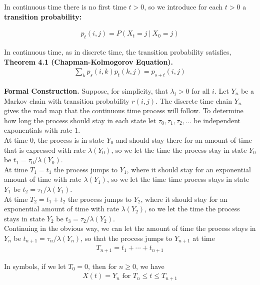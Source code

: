 \documentclass[12pt]{article}
\begin{document}
In continuous time there is no first time $t > 0$, so we introduce for each $t > 0$ a \textbf{transition probability:}

\begin{align*}
p_t(i, j) = P(X_t = j \ | \ X_0 = j)
\end{align*}

In continuous time, as in discrete time, the transition probability satisfies,\\

\textbf{Theorem 4.1 (Chapman-Kolmogorov Equation).} 
\begin{align*}
\sum_k p_s(i,k)p_t(k, j) = p_{s+t}(i, j)
\end{align*}

\textbf{Formal Construction.} Suppose, for simplicity, that $\lambda_i > 0$ for all $i$. Let $Y_n$ be a Markov chain with transition probability $r(i, j)$. The discrete time chain $Y_n$ gives the road map that the continuous time process will follow. To determine how long the process should stay in each state let $\tau_0, \tau_1, \tau_2, \ldots$ be independent exponentials with rate $1$.\\

At time $0$, the process is in state $Y_0$ and should stay there for an amount of time that is expressed with rate $\lambda(Y_0)$, so we let the time the process stay in state $Y_0$ be $t_1 = \tau_0/\lambda(Y_0)$.\\

At time $T_1 = t_1$ the process jumps to $Y_1$, where it should stay for an exponential amount of time with rate $\lambda(Y_1)$, so we let the time time process stays in state $Y_1$ be $t_2 = \tau_1/\lambda(Y_1)$.\\

At time $T_2 = t_1 + t_2$ the process jumps to $Y_2$, where it should stay for an exponential amount of time with rate $\lambda(Y_2)$, so we let the time the process stays in state $Y_2$ be $t_3 = \tau_2/\lambda(Y_2)$.\\

Continuing in the obvious way, we can let the amount of time the process stays in $Y_n$ be $t_{n+1} = \tau_n/\lambda(Y_n)$, so that the process jumps to $Y_{n+1}$ at time
\begin{align*}
T_{n+1} = t_1 + \cdots + t_{n+1}
\end{align*}

In symbols, if we let $T_0 = 0$, then for $n \geq 0$, we have
\begin{align*}
X(t) = Y_n \text{    for } T_n \leq t \leq T_{n+1}
\end{align*}
\end{document}
